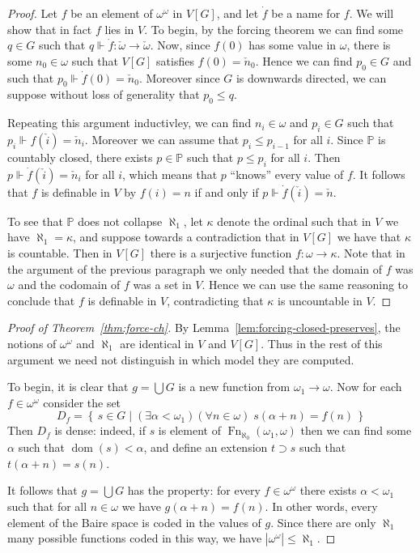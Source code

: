 \documentclass[11pt,oneside,a4paper]{amsbook}
\newcommand{\set}[1]{\left\{\,#1\,\right\}}
\newcommand{\PP}{\mathbb P}
\newcommand{\forces}{\Vdash}
\DeclareMathOperator{\dom}{dom}
\DeclareMathOperator{\Fn}{Fn}
\theoremstyle{definition}
\theoremstyle{plain}
\theoremstyle{definition}
\theoremstyle{remark}
\numberwithin{equation}{section}
\numberwithin{figure}{section}
\begin{document}
\begin{proof}
  Let $f$ be an element of $\omega^\omega$ in $V[G]$, and let $\dot f$ be a name for $f$. We will show that in fact $f$ lies in $V$. To begin, by the forcing theorem we can find some $q\in G$ such that $q\forces \dot f\colon\check\omega\to\check\omega$. Now, since $f(0)$ has some value in $\omega$, there is some $n_0\in\omega$ such that $V[G]$ satisfies $f(0)=\check n_0$. Hence we can find $p_0\in G$ and such that $p_0\forces\dot f(0)=\check n_0$. Moreover since $G$ is downwards directed, we can suppose without loss of generality that $p_0\leq q$.

  Repeating this argument inductivley, we can find $n_i\in\omega$ and $p_i\in G$ such that $p_i\forces f(\check i)=\check n_i$. Moreover we can assume that $p_i\leq p_{i-1}$ for all $i$. Since $\PP$ is countably closed, there exists $p\in\PP$ such that $p\leq p_i$ for all $i$. Then $p\forces\dot f(\check i)=\check n_i$ for all $i$, which means that $p$ ``knows'' every value of $f$. It follows that $f$ is definable in $V$ by $f(i)=n$ if and only if $p\forces\dot f(\check i)=\check n$.

  To see that $\PP$ does not collapse $\aleph_1$, let $\kappa$ denote the ordinal such that in $V$ we have $\aleph_1=\kappa$, and suppose towards a contradiction that in $V[G]$ we have that $\kappa$ is countable. Then in $V[G]$ there is a surjective function $f\colon\omega\to\kappa$. Note that in the argument of the previous paragraph we only needed that the domain of $f$ was $\omega$ and the codomain of $f$ was a set in $V$. Hence we can use the same reasoning to conclude that $f$ is definable in $V$, contradicting that $\kappa$ is uncountable in $V$.
\end{proof}

\begin{proof}[Proof of Theorem~\ref{thm:force-ch}]
  By Lemma~\ref{lem:forcing-closed-preserves}, the notions of $\omega^\omega$ and $\aleph_1$ are identical in $V$ and $V[G]$. Thus in the rest of this argument we need not distinguish in which model they are computed.

  To begin, it is clear that $g=\bigcup G$ is a new function from $\omega_1\to\omega$. Now for each $f\in\omega^\omega$ consider the set
  \[D_f=\set{s\in G\mid (\exists\alpha<\omega_1)(\forall n\in\omega)\;s(\alpha+n)=f(n)}
  \]
  Then $D_f$ is dense: indeed, if $s$ is element of $\Fn_{\aleph_0}(\omega_1,\omega)$ then we can find some $\alpha$ such that $\dom(s)<\alpha$, and define an extension $t\supset s$ such that $t(\alpha+n)=s(n)$.

  It follows that $g=\bigcup G$ has the property: for every $f\in\omega^\omega$ there exists $\alpha<\omega_1$ such that for all $n\in\omega$ we have $g(\alpha+n)=f(n)$. In other words, every element of the Baire space is coded in the values of $g$. Since there are only $\aleph_1$ many possible functions coded in this way, we have $|\omega^\omega|\leq\aleph_1$.
\end{proof}
\end{document}
